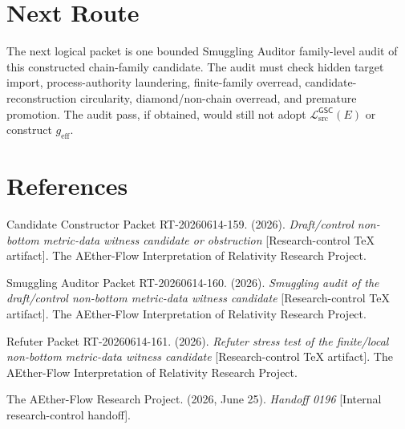 \documentclass[11pt]{article}
\newcommand{\MetricData}{\mathcal{L}_{\mathrm{src}}^{\mathsf{GSC}}}
\newcommand{\geff}{g_{\mathrm{eff}}}
\begin{document}
\section{Next Route}

The next logical packet is one bounded Smuggling Auditor family-level audit of
this constructed chain-family candidate. The audit must check hidden target
import, process-authority laundering, finite-family overread,
candidate-reconstruction circularity, diamond/non-chain overread, and
premature promotion. The audit pass, if obtained, would still not adopt
\(\MetricData(E)\) or construct \(\geff\).

\section{References}

Candidate Constructor Packet RT-20260614-159. (2026). \textit{Draft/control
non-bottom metric-data witness candidate or obstruction} [Research-control
TeX artifact]. The AEther-Flow Interpretation of Relativity Research Project.

Smuggling Auditor Packet RT-20260614-160. (2026). \textit{Smuggling audit of
the draft/control non-bottom metric-data witness candidate} [Research-control
TeX artifact]. The AEther-Flow Interpretation of Relativity Research Project.

Refuter Packet RT-20260614-161. (2026). \textit{Refuter stress test of the
finite/local non-bottom metric-data witness candidate} [Research-control TeX
artifact]. The AEther-Flow Interpretation of Relativity Research Project.

The AEther-Flow Research Project. (2026, June 25). \textit{Handoff 0196}
[Internal research-control handoff].
\end{document}
